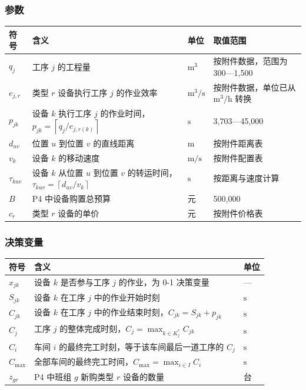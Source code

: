 \documentclass[UTF8,a4paper,12pt]{ctexart}
\begin{document}
\subsubsection{参数}
\begin{center}
\begin{tabular}{llll}
\toprule
符号 & 含义 & 单位 & 取值范围 \\
\midrule
$q_j$ & 工序 $j$ 的工程量 & $\text{m}^3$ & 按附件数据，范围为 300—1,500 \\
$e_{j,r}$ & 类型 $r$ 设备执行工序 $j$ 的作业效率 & $\text{m}^3/\text{s}$ & 按附件数据，单位已从 $\text{m}^3/\text{h}$ 转换 \\
$p_{jk}$ & 设备 $k$ 执行工序 $j$ 的作业时间，$p_{jk} = \left\lceil q_j / e_{j,r(k)} \right\rceil$ & $\text{s}$ & 3,703—45,000 \\
$d_{uv}$ & 位置 $u$ 到位置 $v$ 的直线距离 & $\text{m}$ & 按附件距离表 \\
$v_k$ & 设备 $k$ 的移动速度 & $\text{m/s}$ & 按附件配置表 \\
$\tau_{kuv}$ & 设备 $k$ 从位置 $u$ 到位置 $v$ 的转运时间，$\tau_{kuv} = \left\lceil d_{uv} / v_k \right\rceil$ & $\text{s}$ & 按距离与速度计算 \\
$B$ & P4 中设备购置总预算 & 元 & 500,000 \\
$c_r$ & 类型 $r$ 设备的单价 & 元 & 按附件价格表 \\
\bottomrule
\end{tabular}
\end{center}

\subsubsection{决策变量}
\begin{center}
\begin{tabular}{lll}
\toprule
符号 & 含义 & 单位 \\
\midrule
$x_{jk}$ & 设备 $k$ 是否参与工序 $j$ 的作业，为 0-1 决策变量 & — \\
$S_{jk}$ & 设备 $k$ 在工序 $j$ 中的作业开始时刻 & $\text{s}$ \\
$C_{jk}$ & 设备 $k$ 在工序 $j$ 中的作业结束时刻，$C_{jk} = S_{jk} + p_{jk}$ & $\text{s}$ \\
$C_j$ & 工序 $j$ 的整体完成时刻，$C_j = \max_{k \in K_j^*} C_{jk}$ & $\text{s}$ \\
$C_i$ & 车间 $i$ 的最终完工时刻，等于该车间最后一道工序的 $C_j$ & $\text{s}$ \\
$C_{\max}$ & 全部车间的最终完工时间，$C_{\max} = \max_{i \in I} C_i$ & $\text{s}$ \\
$z_{gr}$ & P4 中班组 $g$ 新购类型 $r$ 设备的数量 & 台 \\
\bottomrule
\end{tabular}
\end{center}
\end{document}
